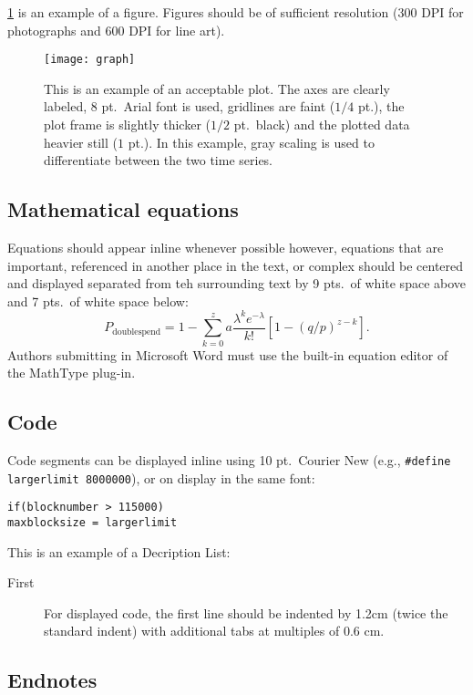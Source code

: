 \documentclass{ledger}
\begin{document}
\cref{fig:1} is an example of a figure.  Figures should be of sufficient resolution (300 DPI for photographs and 600 DPI for line art).

\begin{figure}[ht]
\centering
\texttt{[image: graph]}
\caption{This is an example of an acceptable plot.  The axes are clearly labeled, 8 pt.\ Arial font is used, gridlines are faint ($1/4$ pt.), the plot frame is slightly thicker ($1/2$ pt.\ black) and the plotted data heavier still ($1$ pt.).  In this example, gray scaling is used to differentiate between the two time series.}
\label{fig:1}
\end{figure}

\subsection{Mathematical equations}

Equations should appear inline whenever possible however, equations that are important, referenced in another place in the text, or complex should be centered and displayed separated from teh surrounding text by 9 pts.\ of white space above and 7 pts.\ of white space below:
\begin{equation}
P_{\text{doublespend}}=1-\sum _{k=0}^za\frac{\lambda ^ke^{-\lambda}}{k!}\left[ 1-(q/p)^{z-k}\right] .
\end{equation}
Authors submitting in Microsoft Word must use the built-in equation editor of the MathType plug-in.

\subsection{Code}

Code segments can be displayed inline using 10 pt.~Courier New (e.g., \lstinline|#define largerlimit 8000000|), or on display in the same font:
\begin{lstlisting}
if(blocknumber > 115000)
maxblocksize = largerlimit
\end{lstlisting}

\noindent This is an example of a Decription List:
\begin{description}
\item[First] For displayed code, the first line should be indented by 1.2cm
  (twice the standard indent) with additional tabs at multiples of 0.6 cm.
\end{description} 
  

\subsection{Endnotes}
\end{document}

